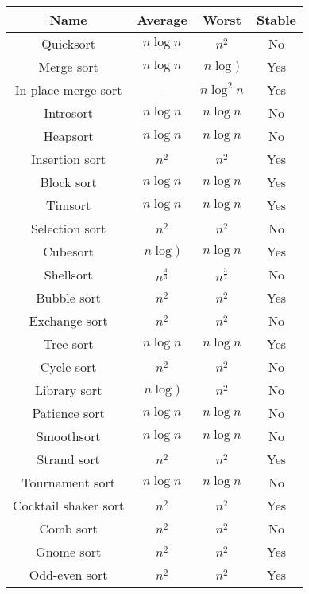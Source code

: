 \documentclass{article}
\begin{document}
\begin{table}[ht]
	\centering
	\scriptsize
	\begin{tabular}{cccc}
		Name & Average & Worst & Stable\\
		\hline
		Quicksort & $n\log{n}$ & $n^2$ & No\\
		Merge sort & $n\log{n}$ & $n\log{)}$ & Yes\\
		In-place merge sort & - & $n\log^2{n}$ & Yes\\
		Introsort & $n\log{n}$ & $n\log{n}$ & No\\
		Heapsort & $n\log{n}$ & $n\log{n}$ & No\\
		Insertion sort & $n^2$ & $n^2$ & Yes\\
		Block sort & $n\log{n}$ & $n\log{n}$ & Yes\\
		Timsort & $n\log{n}$ & $n\log{n}$ & Yes\\
		Selection sort & $n^2$ & $n^2$ & No\\
		Cubesort & $n\log{)}$ & $n\log{n}$ & Yes\\
		Shellsort & $n^{\frac{4}{3}}$ & $n^{\frac{3}{2}}$ & No\\
		Bubble sort & $n^2$ & $n^2$ & Yes\\
		Exchange sort & $n^2$ & $n^2$ & No\\
		Tree sort & $n\log{n}$ & $n\log{n}$ & Yes\\
		Cycle sort & $n^2$ & $n^2$ & No\\
		Library sort & $n\log{)}$ & $n^2$ & No\\
		Patience sort & $n\log{n}$ & $n\log{n}$ & No\\
		Smoothsort & $n\log{n}$ & $n\log{n}$ & No\\
		Strand sort & $n^2$ & $n^2$ & Yes\\
		Tournament sort & $n\log{n}$ & $n\log{n}$ & No\\
		Cocktail shaker sort & $n^2$ & $n^2$ & Yes\\
		Comb sort & $n^2$ & $n^2$ & No\\
		Gnome sort & $n^2$ & $n^2$ & Yes\\
		Odd-even sort & $n^2$ & $n^2$ & Yes\\
		\hline
	\end{tabular}
\end{table}

\end{document}
